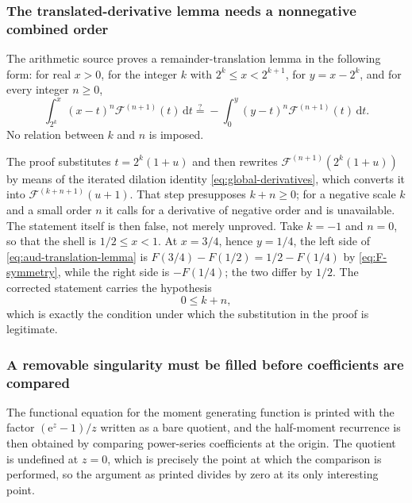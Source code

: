 \documentclass[11pt,oneside]{article}
\theoremstyle{definition}
\theoremstyle{remark}
\newcommand{\e}{\mathrm e}
\newcommand{\dd}{\,\mathrm d}
\begin{document}
\subsubsection{The translated-derivative lemma needs a nonnegative combined order}

The arithmetic source proves a remainder-translation lemma in the following form: for real
$x>0$, for the integer $k$ with $2^{k}\le x<2^{k+1}$, for $y=x-2^{k}$, and for every integer
$n\ge0$,
\begin{equation}
 \int_{2^{k}}^{x}(x-t)^{n}\mathcal F^{(n+1)}(t)\dd t
 \overset{?}{=}-\int_{0}^{y}(y-t)^{n}\mathcal F^{(n+1)}(t)\dd t.
                                                          \label{eq:aud-translation-lemma}
\end{equation}
No relation between $k$ and $n$ is imposed.

The proof substitutes $t=2^{k}(1+u)$ and then rewrites $\mathcal F^{(n+1)}(2^{k}(1+u))$ by
means of the iterated dilation identity \eqref{eq:global-derivatives}, which converts it into
$\mathcal F^{(k+n+1)}(u+1)$.  That step presupposes $k+n\ge0$; for a negative scale $k$ and a
small order $n$ it calls for a derivative of negative order and is unavailable.  The
statement itself is then false, not merely unproved.  Take $k=-1$ and $n=0$, so that the
shell is $1/2\le x<1$.  At $x=3/4$, hence $y=1/4$, the left side of
\eqref{eq:aud-translation-lemma} is $F(3/4)-F(1/2)=1/2-F(1/4)$ by \eqref{eq:F-symmetry},
while the right side is $-F(1/4)$; the two differ by $1/2$.  The corrected statement carries
the hypothesis
\begin{equation}
 0\le k+n,                                                \label{eq:aud-combined-order}
\end{equation}
which is exactly the condition under which the substitution in the proof is legitimate.

\subsubsection{A removable singularity must be filled before coefficients are compared}

The functional equation for the moment generating function is printed with the factor
$(\e^{z}-1)/z$ written as a bare quotient, and the half-moment recurrence is then obtained by
comparing power-series coefficients at the origin.  The quotient is undefined at $z=0$,
which is precisely the point at which the comparison is performed, so the argument as printed
divides by zero at its only interesting point.
\end{document}
